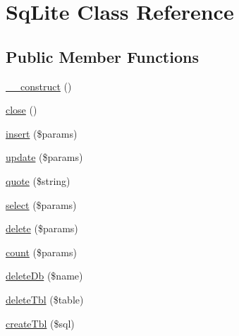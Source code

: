 \hypertarget{class_zest_1_1_database_1_1_drives_1_1_sq_lite_1_1_sq_lite}{}\section{Sq\+Lite Class Reference}
\label{class_zest_1_1_database_1_1_drives_1_1_sq_lite_1_1_sq_lite}
\subsection*{Public Member Functions}
\begin{DoxyCompactItemize}
\item 
\mbox{\hyperlink{class_zest_1_1_database_1_1_drives_1_1_sq_lite_1_1_sq_lite_a095c5d389db211932136b53f25f39685}{\+\_\+\+\_\+construct}} ()
\item 
\mbox{\hyperlink{class_zest_1_1_database_1_1_drives_1_1_sq_lite_1_1_sq_lite_aa69c8bf1f1dcf4e72552efff1fe3e87e}{close}} ()
\item 
\mbox{\hyperlink{class_zest_1_1_database_1_1_drives_1_1_sq_lite_1_1_sq_lite_a67366620fdfeaab4b480b6e4dca64deb}{insert}} (\$params)
\item 
\mbox{\hyperlink{class_zest_1_1_database_1_1_drives_1_1_sq_lite_1_1_sq_lite_aacfc8ca52b10f139be3398f374cd01cb}{update}} (\$params)
\item 
\mbox{\hyperlink{class_zest_1_1_database_1_1_drives_1_1_sq_lite_1_1_sq_lite_ab0de61372611c058fe76c1a341691182}{quote}} (\$string)
\item 
\mbox{\hyperlink{class_zest_1_1_database_1_1_drives_1_1_sq_lite_1_1_sq_lite_aaade19290861bb3abf902bb14a51889b}{select}} (\$params)
\item 
\mbox{\hyperlink{class_zest_1_1_database_1_1_drives_1_1_sq_lite_1_1_sq_lite_a2fb5b35138aabdbcdbabde07ff1df4b6}{delete}} (\$params)
\item 
\mbox{\hyperlink{class_zest_1_1_database_1_1_drives_1_1_sq_lite_1_1_sq_lite_a47d80aeef2e59da428db2507a28a34ac}{count}} (\$params)
\item 
\mbox{\hyperlink{class_zest_1_1_database_1_1_drives_1_1_sq_lite_1_1_sq_lite_ae35a90b0a5f1b3d17dfbe5323b6d6983}{delete\+Db}} (\$name)
\item 
\mbox{\hyperlink{class_zest_1_1_database_1_1_drives_1_1_sq_lite_1_1_sq_lite_a865173a2c9500d4ba41ce697bd71209a}{delete\+Tbl}} (\$table)
\item 
\mbox{\hyperlink{class_zest_1_1_database_1_1_drives_1_1_sq_lite_1_1_sq_lite_adfcacab70ff8275177a010598e68b186}{create\+Tbl}} (\$sql)
\end{DoxyCompactItemize}


